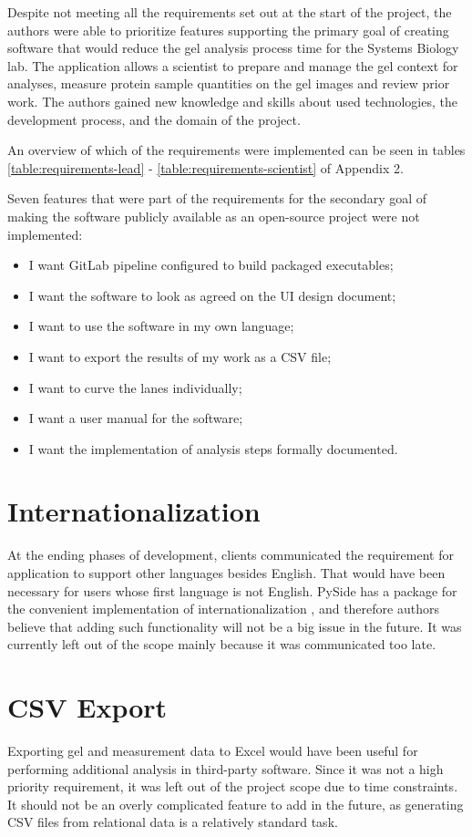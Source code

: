 Despite not meeting all the requirements set out at the start of the project, the authors were able to prioritize features supporting the primary goal of creating software that would reduce the gel analysis process time for the Systems Biology lab. The application allows a scientist to prepare and manage the gel context for analyses, measure protein sample quantities on the gel images and review prior work. The authors gained new knowledge and skills about used technologies, the development process, and the domain of the project.

An overview of which of the requirements were implemented can be seen in tables \ref{table:requirements-lead} - \ref{table:requirements-scientist} of Appendix 2.

Seven features that were part of the requirements for the secondary goal of making the software publicly available as an open-source project were not implemented:
\begin{itemize}
    \item I want GitLab pipeline configured to build packaged executables;
    \item I want the software to look as agreed on the UI design document;
    \item I want to use the software in my own language;
    \item I want to export the results of my work as a CSV file;
    \item I want to curve the lanes individually;
    \item I want a user manual for the software;
    \item I want the implementation of analysis steps formally documented.
\end{itemize}

\section{Internationalization}
At the ending phases of development, clients communicated the requirement for application to support other languages besides English. That would have been necessary for users whose first language is not English. PySide has a package for the convenient implementation of internationalization \cite{pyside-intl}, and therefore authors believe that adding such functionality will not be a big issue in the future. It was currently left out of the scope mainly because it was communicated too late.

\section{CSV Export}
Exporting gel and measurement data to Excel would have been useful for performing additional analysis in third-party software. Since it was not a high priority requirement, it was left out of the project scope due to time constraints. It should not be an overly complicated feature to add in the future, as generating CSV files from relational data is a relatively standard task.

